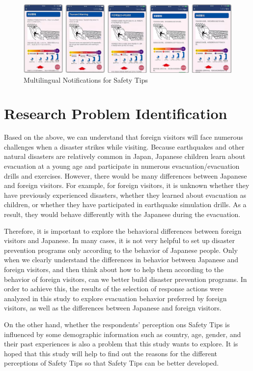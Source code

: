 \begin{figure}[h]
  \includegraphics[width=\linewidth]{Figure/Figure4.png}
  \centering
  \caption[Multilingual Notifications for Safety Tips]{Multilingual Notifications for Safety Tips\protect\footnotemark }
  \label{fig4}
\end{figure}

\section{Research Problem Identification}
Based on the above, we can understand that foreign visitors will face numerous challenges when a disaster strikes while visiting. Because earthquakes and other natural disasters are relatively common in Japan, Japanese children learn about evacuation at a young age and participate in numerous evacuation/evacuation drills and exercises. However, there would be many differences between Japanese and foreign visitors. For example, for foreign visitors, it is unknown whether they have previously experienced disasters, whether they learned about evacuation as children, or whether they have participated in earthquake simulation drills. As a result, they would behave differently with the Japanese during the evacuation. 

Therefore, it is important to explore the behavioral differences between foreign visitors and Japanese. In many cases, it is not very helpful to set up disaster prevention programs only according to the behavior of Japanese people. Only when we clearly understand the differences in behavior between Japanese and foreign visitors, and then think about how to help them according to the behavior of foreign visitors, can we better build disaster prevention programs. In order to achieve this, the results of the selection of response actions were analyzed in this study to explore evacuation behavior preferred by foreign visitors, as well as the differences between Japanese and foreign visitors.

On the other hand, whether the respondents' perception ons Safety Tips is influenced by some demographic information such as country, age, gender, and their past experiences is also a problem that this study wants to explore. It is hoped that this study will help to find out the reasons for the different perceptions of Safety Tips so that Safety Tips can be better developed.

